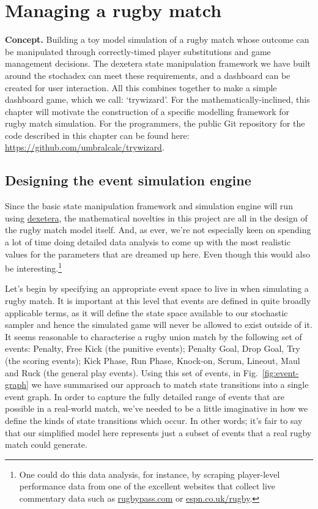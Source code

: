 \chapter{\sffamily Managing a rugby match}

{\bfseries\sffamily Concept.} Building a toy model simulation of a rugby match whose outcome can be manipulated through correctly-timed player substitutions and game management decisions. The dexetera state manipulation framework we have built around the stochadex can meet these requirements, and a dashboard can be created for user interaction. All this combines together to make a simple dashboard game, which we call: `trywizard'. For the mathematically-inclined, this chapter will motivate the construction of a specific modelling framework for rugby match simulation. For the programmers, the public Git repository for the code described in this chapter can be found here: \href{https://github.com/umbralcalc/trywizard}{https://github.com/umbralcalc/trywizard}.

\section{\sffamily Designing the event simulation engine}

Since the basic state manipulation framework and simulation engine will run using \href{https://github.com/umbralcalc/dexetera}{dexetera}, the mathematical novelties in this project are all in the design of the rugby match model itself. And, as ever, we're not especially keen on spending a lot of time doing detailed data analysis to come up with the most realistic values for the parameters that are dreamed up here. Even though this would also be interesting.\footnote{One could do this data analysis, for instance, by scraping player-level performance data from one of the excellent websites that collect live commentary data such as \href{https://www.rugbypass.com/}{rugbypass.com} or \href{https://www.espn.co.uk/rugby/}{espn.co.uk/rugby}.}

Let's begin by specifying an appropriate event space to live in when simulating a rugby match. It is important at this level that events are defined in quite broadly applicable terms, as it will define the state space available to our stochastic sampler and hence the simulated game will never be allowed to exist outside of it. It seems reasonable to characterise a rugby union match by the following set of events: Penalty, Free Kick (the punitive events); Penalty Goal, Drop Goal, Try (the scoring events); Kick Phase, Run Phase, Knock-on, Scrum, Lineout, Maul and Ruck (the general play events). Using this set of events, in Fig.~\ref{fig:event-graph} we have summarised our approach to match state transitions into a single event graph. In order to capture the fully detailed range of events that are possible in a real-world match, we've needed to be a little imaginative in how we define the kinds of state transitions which occur. In other words; it's fair to say that our simplified model here represents just a subset of events that a real rugby match could generate.

